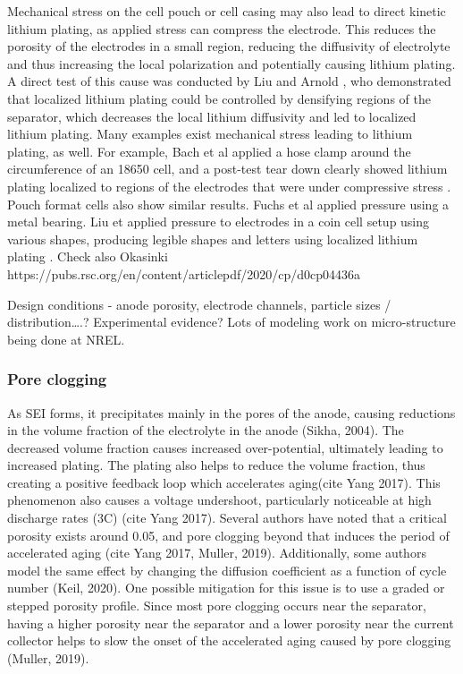 \documentclass{article}
\begin{document}
Mechanical stress on the cell pouch or cell casing may also lead to direct kinetic lithium plating, as applied stress can compress the electrode. This reduces the porosity of the electrodes in a small region, reducing the diffusivity of electrolyte and thus increasing the local polarization and potentially causing lithium plating. A direct test of this cause was conducted by Liu and Arnold \cite{liu_effects_2020}, who demonstrated that localized lithium plating could be controlled by densifying regions of the separator, which decreases the local lithium diffusivity and led to localized lithium plating. Many examples exist mechanical stress leading to lithium plating, as well. For example, Bach et al applied a hose clamp around the circumference of an 18650 cell, and a post-test tear down clearly showed lithium plating localized to regions of the electrodes that were under compressive stress \cite{bach_nonlinear_2016}. Pouch format cells also show similar results. Fuchs et al \cite{fuchs_post-mortem_2019} applied pressure using a metal bearing. Liu et applied pressure to electrodes in a coin cell setup using various shapes, producing legible shapes and letters using localized lithium plating \cite{liu_size_2018}.
Check also Okasinki https://pubs.rsc.org/en/content/articlepdf/2020/cp/d0cp04436a

Design conditions - anode porosity, electrode channels, particle sizes / distribution….? Experimental evidence? Lots of modeling work on micro-structure being done at NREL.



\subsubsection{Pore clogging}
As SEI forms, it precipitates mainly in the pores of the anode, causing reductions in the volume fraction of the electrolyte in the anode (Sikha, 2004). The decreased volume fraction causes increased over-potential, ultimately leading to increased plating. The plating also helps to reduce the volume fraction, thus creating a positive feedback loop which accelerates aging(cite Yang 2017). This phenomenon also causes a voltage undershoot, particularly noticeable at high discharge rates (3C) (cite Yang 2017). Several authors have noted that a critical porosity exists around 0.05, and pore clogging beyond that induces the period of accelerated aging (cite Yang 2017, Muller, 2019). Additionally, some authors model the same effect by changing the diffusion coefficient as a function of cycle number (Keil, 2020). One possible mitigation for this issue is to use a graded or stepped porosity profile. Since most pore clogging occurs near the separator, having a higher porosity near the separator and a lower porosity near the current collector helps to slow the onset of the accelerated aging caused by pore clogging (Muller, 2019).
\end{document}
